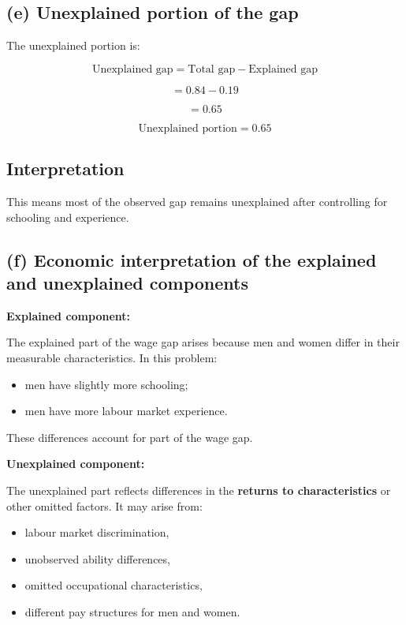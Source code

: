 \documentclass[12pt]{article}
\begin{document}
\vspace{0.8em}

\subsection*{(e) Unexplained portion of the gap}

The unexplained portion is:

\[
\text{Unexplained gap} = \text{Total gap} - \text{Explained gap}
\]

\[
= 0.84 - 0.19
\]

\[
= 0.65
\]

\[
\boxed{\text{Unexplained portion} = 0.65}
\]

\subsection*{Interpretation}

This means most of the observed gap remains unexplained after controlling for schooling and experience.

\vspace{0.8em}

\subsection*{(f) Economic interpretation of the explained and unexplained components}

\textbf{Explained component:}

The explained part of the wage gap arises because men and women differ in their measurable characteristics. In this problem:

\begin{itemize}
    \item men have slightly more schooling;
    \item men have more labour market experience.
\end{itemize}

These differences account for part of the wage gap.

\textbf{Unexplained component:}

The unexplained part reflects differences in the \textbf{returns to characteristics} or other omitted factors. It may arise from:

\begin{itemize}
    \item labour market discrimination,
    \item unobserved ability differences,
    \item omitted occupational characteristics,
    \item different pay structures for men and women.
\end{itemize}
\end{document}
